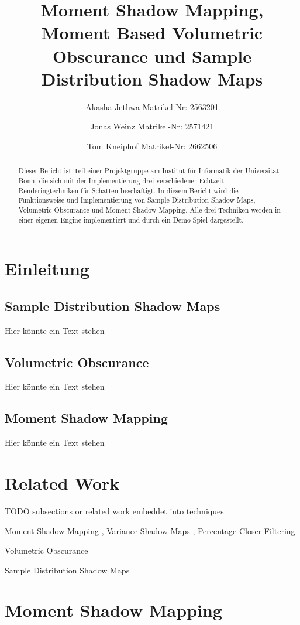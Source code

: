 \documentclass[runningheaders,a4paper]{llncs}
\title{ Moment Shadow Mapping, Moment Based Volumetric Obscurance und Sample Distribution Shadow Maps }
\author{
	Akasha Jethwa 
	Matrikel-Nr: 2563201
	\and
	Jonas Weinz 
	Matrikel-Nr: 2571421
	\and
	Tom Kneiphof 
	Matrikel-Nr: 2662506
}
\institute{Institut für Informatik der Universität Bonn}
\begin{document}
\maketitle

\begin{abstract}
Dieser Bericht ist Teil einer Projektgruppe am Institut für Informatik der Universität Bonn,
die sich mit der Implementierung drei verschiedener Echtzeit-Renderingtechniken für Schatten 
beschäftigt. In diesem Bericht wird die Funktionsweise und Implementierung von Sample Distribution Shadow Maps, 
Volumetric-Obscurance und Moment Shadow Mapping. Alle drei Techniken werden in einer eigenen Engine implementiert und
durch ein Demo-Spiel dargestellt.
\end{abstract}

\section{Einleitung}
\subsection{Sample Distribution Shadow Maps}
Hier könnte ein Text stehen
\subsection{Volumetric Obscurance}
Hier könnte ein Text stehen
\subsection{Moment Shadow Mapping}
Hier könnte ein Text stehen

\section{Related Work}

TODO subsections or related work embeddet into techniques

Moment Shadow Mapping \cite{peters2015moment}, Variance Shadow Maps \cite{donnelly2006variance}, Percentage Closer Filtering \cite{reeves1987rendering}

Volumetric Obscurance \cite{loos2010volumetric}

Sample Distribution Shadow Maps \cite{lauritzen2011sample}


\section{Moment Shadow Mapping}
\end{document}
